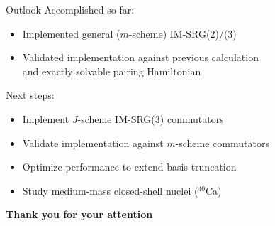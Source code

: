 \documentclass{beamer}
\begin{document}
  \begin{frame}{Outlook}
    Accomplished so far:
    \begin{itemize}
      \item{Implemented general ($m$-scheme) IM-SRG(2)/(3)}
      \item{Validated implementation against previous calculation \\
        and exactly solvable pairing Hamiltonian}
    \end{itemize}
    Next steps:
    \begin{itemize}
      \item{Implement $J$-scheme IM-SRG(3) commutators}
      \item{Validate implementation against $m$-scheme commutators}
      \item{Optimize performance to extend basis truncation}
      \item{Study medium-mass closed-shell nuclei (${}^{40}\text{Ca}$)}
    \end{itemize}

    \pause
    \begin{center}
    \textbf{Thank you for your attention}
    \end{center}
  \end{frame}
\end{document}
